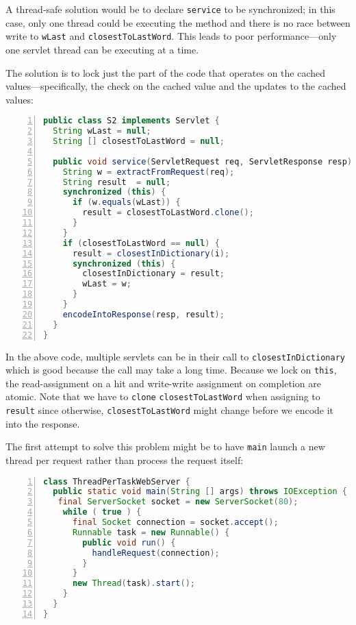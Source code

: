 A thread-safe solution would be to declare \texttt{service} to be synchronized;
in this case, only one thread could be executing the method
and there is no race between write to \texttt{wLast} and \texttt{closestToLastWord}.
This leads to poor performance---only one servlet thread can be executing at a time.

The solution is to lock just the part of the code that operates
on the cached values---specifically, the check on the cached value 
and the updates to the cached values: 
\begin{lstlisting}[basicstyle=\footnotesize,numbers=left,breaklines=true,language=Java]
public class S2 implements Servlet {
  String wLast = null;
  String [] closestToLastWord = null;

  public void service(ServletRequest req, ServletResponse resp) {
    String w = extractFromRequest(req);
    String result  = null;
    synchronized (this) {
      if (w.equals(wLast)) {
        result = closestToLastWord.clone();
      }
    }
    if (closestToLastWord == null) {
      result = closestInDictionary(i);
      synchronized (this) {
        closestInDictionary = result;
        wLast = w;
      }
    }
    encodeIntoResponse(resp, result);
  }
}
\end{lstlisting}

In the above code, multiple servlets can be in their call to \texttt{closestInDictionary}
which is good because the call may take a  long time.
Because we lock on \texttt{this}, the read-assignment on a hit
and write-write assignment on completion are atomic. Note that
we have to \texttt{clone} \texttt{closestToLastWord} when assigning
to \texttt{result} since otherwise, \texttt{closestToLastWord} might change before we encode
it into the response.

The first attempt to solve this problem might be to have \texttt{main}
launch a new thread per request rather than process the request
itself:
\begin{lstlisting}[basicstyle=\footnotesize,numbers=left,breaklines=true,language=Java]
class ThreadPerTaskWebServer {
  public static void main(String [] args) throws IOException {
   final ServerSocket socket = new ServerSocket(80);
    while ( true ) {
      final Socket connection = socket.accept();
      Runnable task = new Runnable() {
        public void run() {
          handleRequest(connection);
        }
      }
      new Thread(task).start();
    }
  }
}
\end{lstlisting}


